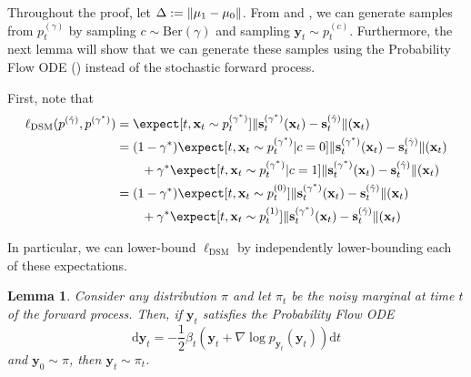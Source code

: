 \documentclass[11pt]{article}
\newcommand{\fitparenth}[1]{\left(#1\right)}
\newcommand{\vect}[1]{\mathbf{#1}}
\theoremstyle{plain}
\newtheorem{lemma}[theorem]{Lemma}
\newcommand{\1}{\mathbbm{1}}
\DeclarePairedDelimiter{\norm}{\lVert}{\rVert}
\newcommand{\ldsm}{\ell_\mathrm{DSM}}
\newcommand{\pdist}[2][]{p_{#1}^{(#2)}}
\newcommand{\score}[2][]{\vect{s}_{#1}^{(#2)}}
\newcommand{\separation}{\Delta}
\begin{document}
\begin{appendices}
Throughout the proof, let $\separation:=\norm{\mu_1-\mu_0}$. From  and , we can generate samples from $\pdist[t]{\gamma}$ by sampling $c\sim \mathrm{Ber}(\gamma)$ and sampling $\vect y_t\sim \pdist[t]{c}$. Furthermore, the next lemma will show that we can generate these samples using the Probability Flow ODE (\citep{song2021scorebasedgenerativemodelingstochastic}) instead of the stochastic forward process.

First, note that 
\begin{align}\label{eq: mode decomposition}
    \ldsm(\pdist{\hat\gamma},\pdist{\gamma^*})&= \expect[t,\vect x_t\sim \pdist[t]{\gamma^*}]{\norm{\score[t]{\gamma^*}(\vect x_t)-\score[t]{\hat\gamma}}(\vect x_t)}
    \\
    &= (1-\gamma^*)\expect[t,\vect x_t\sim \pdist[t]{\gamma^*}|c=0]{\norm{\score[t]{\gamma^*}(\vect x_t)-\score[t]{\hat\gamma}}(\vect x_t)}
    \\
    &\quad\quad + \gamma^*\expect[t,\vect x_t\sim \pdist[t]{\gamma^*}|c=1]{\norm{\score[t]{\gamma^*}(\vect x_t)-\score[t]{\hat\gamma}}(\vect x_t)}
    \\
    &= (1-\gamma^*)\expect[t,\vect x_t\sim \pdist[t]{0}]{\norm{\score[t]{\gamma^*}(\vect x_t)-\score[t]{\hat\gamma}}(\vect x_t)}
    \\
    &\quad\quad + \gamma^*\expect[t,\vect x_t\sim \pdist[t]{1}]{\norm{\score[t]{\gamma^*}(\vect x_t)-\score[t]{\hat\gamma}}(\vect x_t)}
\end{align}

In particular, we can lower-bound $\ldsm$ by independently lower-bounding each of these expectations.

\begin{lemma}
    Consider any distribution $\pi$ and let $\pi_t$ be the noisy marginal at time $t$ of the forward process. Then, if $\vect y_t$ satisfies the Probability Flow ODE
    \begin{equation}\label{eqn: Probability Flow ODE}
        \mathrm{d}\vect y_t = -\frac{1}{2}\beta_t\fitparenth{\vect y_t + \nabla \log p_{\vect y_t}(\vect y_t)}\mathrm{d}t
    \end{equation}
    and $\vect y_0\sim \pi$, then $\vect y_t\sim \pi_t$.
\end{lemma}


\end{appendices}
\end{document}
